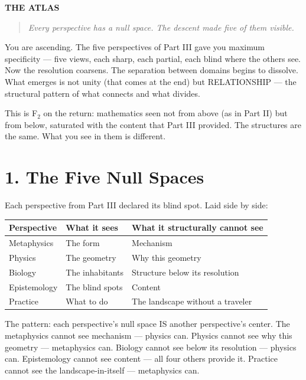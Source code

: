 \vspace{1cm}
\begin{center}
{\Large\sffamily\bfseries\color{headerblue} THE ATLAS}
\end{center}
\vspace{0.5cm}


\begin{quote}
\itshape
\textit{Every perspective has a null space. The descent made five of them visible.}
\end{quote}


\bigskip\noindent\makebox[\textwidth]{\color{rulegray}\rule{5cm}{0.3pt}}\bigskip


You are ascending. The five perspectives of Part III gave you maximum specificity — five views, each sharp, each partial, each blind where the others see. Now the resolution coarsens. The separation between domains begins to dissolve. What emerges is not unity (that comes at the end) but RELATIONSHIP — the structural pattern of what connects and what divides.


This is F$_2$ on the return: mathematics seen not from above (as in Part II) but from below, saturated with the content that Part III provided. The structures are the same. What you see in them is different.


\section*{1. The Five Null Spaces}


Each perspective from Part III declared its blind spot. Laid side by side:



\begin{longtable}{p{} p{} p{}}
\toprule
\textbf{Perspective} & \textbf{What it sees} & \textbf{What it structurally cannot see} \\
\midrule
\endhead
Metaphysics & The form & Mechanism \\
Physics & The geometry & Why this geometry \\
Biology & The inhabitants & Structure below its resolution \\
Epistemology & The blind spots & Content \\
Practice & What to do & The landscape without a traveler \\
\bottomrule
\end{longtable}



The pattern: each perspective's null space IS another perspective's center. The metaphysics cannot see mechanism — physics can. Physics cannot see why this geometry — metaphysics can. Biology cannot see below its resolution — physics can. Epistemology cannot see content — all four others provide it. Practice cannot see the landscape-in-itself — metaphysics can.


